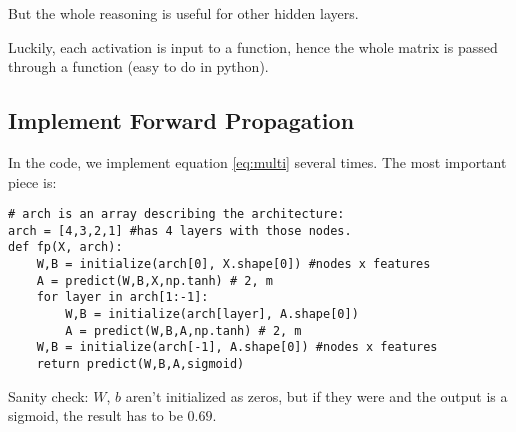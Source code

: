 But the whole reasoning is useful for other hidden layers.

Luckily, each activation is input to a function, hence the whole matrix is passed through a function (easy to do in python).

\subsection{Implement Forward Propagation}
In the code, we implement equation \ref{eq:multi} several times. The most important piece is:

\begin{verbatim}
# arch is an array describing the architecture:
arch = [4,3,2,1] #has 4 layers with those nodes.
def fp(X, arch):
    W,B = initialize(arch[0], X.shape[0]) #nodes x features
    A = predict(W,B,X,np.tanh) # 2, m
    for layer in arch[1:-1]:
        W,B = initialize(arch[layer], A.shape[0]) 
        A = predict(W,B,A,np.tanh) # 2, m
    W,B = initialize(arch[-1], A.shape[0]) #nodes x features
    return predict(W,B,A,sigmoid)
\end{verbatim}

Sanity check: $W$, $b$ aren't initialized as zeros, but if they were and the output is a sigmoid, the result has to be $0.69$.

